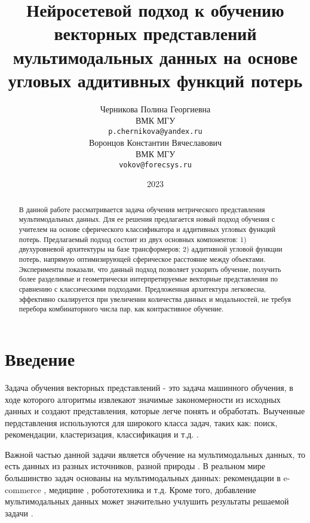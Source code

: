 \documentclass{article}
\title{Нейросетевой подход к обучению векторных представлений мультимодальных данных на основе угловых аддитивных функций потерь}
\author{ Черникова Полина Георгиевна \\
	ВМК МГУ\\
	\texttt{p.chernikova@yandex.ru} \\
	\And
	Воронцов Константин Вячеславович \\
	ВМК МГУ\\
	\texttt{vokov@forecsys.ru} \\
}
\date{2023}
\begin{document}
\maketitle
\begin{abstract}
В данной работе рассматривается задача обучения метрического представления мультимодальных данных. Для ее решения предлагается новый подход обучения с учителем на основе сферического классификатора и аддитивных угловых функций потерь.  
Предлагаемый подход состоит из двух основных компонентов: 1) двухуровневой архитектуры на базе трансформеров; 2) аддитивной угловой функции потерь, напрямую оптимизирующей сферическое расстояние между объектами.
Эксперименты показали, что данный подход позволяет ускорить обучение, получить более разделимые и геометрически интерпретируемые векторные представления по сравнению с классическими подходами.
Предложенная архитектура легковесна, эффективно скалируется при увеличении количества данных и модальностей, не требуя перебора комбинаторного числа пар, как контрастивное обучение. 
\end{abstract}



\section{Введение}
\par Задача обучения векторных представлений - это задача машинного обучения, в ходе которого алгоритмы извлекают значимые закономерности из исходных данных и создают представления, которые легче понять и обработать. Выученные пердставления используются для широкого класса задач, таких как: поиск, рекомендации, кластеризация, классификация и т.д. \cite{9068414}.

Важной частью данной задачи является обучение на мультимодальных данных, то есть данных из разных источников, разной природы \cite{ngiam2011multimodal}. В реальном мире большинство задач основаны на мультимодальных данных: рекомендации в e-commerce \cite{Bai_2023_ICCV}, медицине \cite{huang2021gloria}, робототехника \cite{9354900} и т.д.  Кроме того, добавление мультимодальных данных может значительно учлушить результаты решаемой задачи \cite{8949228}. 
\end{document}
